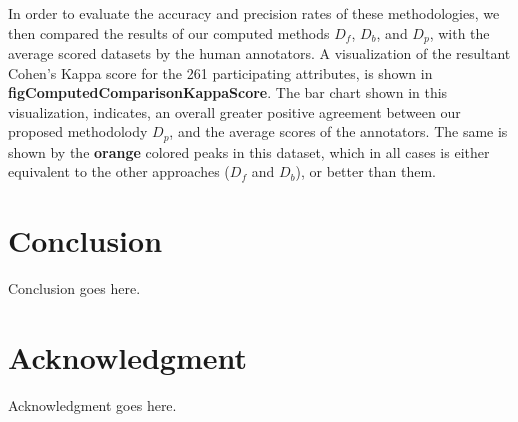 \documentclass{ieeeaccess}
\begin{document}
In order to evaluate the accuracy and precision rates of these methodologies, we then compared the results of our computed methods $D_f$, $D_b$, and $D_p$, with the average scored datasets by the human annotators. A visualization of the resultant Cohen's Kappa score for the 261 participating attributes, is shown in \textbf{figComputedComparisonKappaScore}. The bar chart shown in this visualization, indicates, an overall greater positive agreement between our proposed methodolody $D_p$, and the average scores of the annotators. The same is shown by the \textbf{orange} colored peaks in this dataset, which in all cases is either equivalent to the other approaches ($D_f$ and $D_b$), or better than them.

\section{Conclusion}
Conclusion goes here. 


\section*{Acknowledgment}

Acknowledgment goes here.





\end{document}
